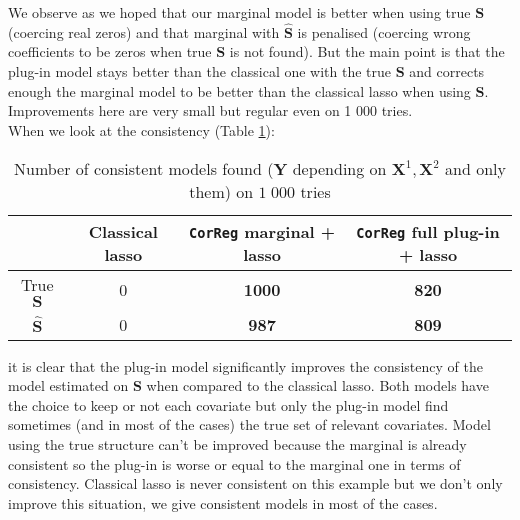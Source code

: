\documentclass[12pt,a4paper]{report}
\begin{document}
		We observe as we hoped that our marginal model is better when using true $\boldsymbol{S}$ (coercing real zeros) and that marginal with $\hat{\boldsymbol{S}}$ is penalised (coercing wrong coefficients to be zeros when true $\boldsymbol{S}$ is not found).
		But the main point is that the plug-in model stays better than the classical one with the true $\boldsymbol{S}$ and corrects enough the marginal model to be better than the classical {\sc lasso} when using $\hat{\boldsymbol{S}}$. Improvements here are very small but regular even on 1 000 tries.\\
		
		When we look at the consistency (Table \ref{testidentifiableG}):
		\begin{table}[h!]	
		\centering
		\begin{tabular}{|c|c|c|c|}
		\hline 
		 & Classical {\sc lasso} & {\tt CorReg}  marginal + {\sc lasso}& {\tt CorReg}  full plug-in  + {\sc lasso} \\ 
		\hline 
		True $\boldsymbol{S}$ &  0 & \textbf{1000} & \textbf{820} \\ 
		\hline 
		$\hat{\boldsymbol{S}}$ & 0 & \textbf{987} & \textbf{809} \\ 
		\hline 
		\end{tabular} 
		\caption{Number of consistent models found ($\boldsymbol{Y}$ depending on $\boldsymbol{X}^1,\boldsymbol{X}^2$ and only them) on $1\;000$ tries}\label{testidentifiableG}
		\end{table}				
		it is clear that the plug-in model significantly improves the consistency of the model estimated on $\boldsymbol{S}$ when compared to the classical {\sc lasso}. Both models have the choice to keep or not each covariate but only the plug-in model find sometimes (and in most of the cases) the true set of relevant covariates. Model using the true structure can't be improved because the marginal is already consistent so the plug-in is worse or equal to the marginal one in terms of consistency. Classical {\sc lasso} is never consistent on this example but we don't only improve this situation, we give consistent models in most of the cases.\\
		
\end{document}
